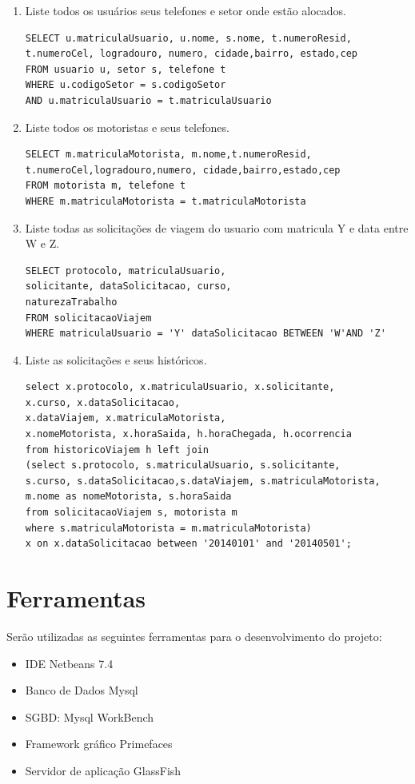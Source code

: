 \documentclass[11pt]{article}
\begin{document}
\begin{enumerate}
\item Liste todos os usuários seus telefones e setor onde estão alocados. 
\begin{verbatim}
SELECT u.matriculaUsuario, u.nome, s.nome, t.numeroResid, 
t.numeroCel, logradouro, numero, cidade,bairro, estado,cep
FROM usuario u, setor s, telefone t
WHERE u.codigoSetor = s.codigoSetor
AND u.matriculaUsuario = t.matriculaUsuario
\end{verbatim}

\item Liste todos os motoristas e seus telefones. 
\begin{verbatim}
SELECT m.matriculaMotorista, m.nome,t.numeroResid,
t.numeroCel,logradouro,numero, cidade,bairro,estado,cep
FROM motorista m, telefone t
WHERE m.matriculaMotorista = t.matriculaMotorista
\end{verbatim}

\item Liste todas as solicitações de viagem do usuario com matricula Y e data entre W e Z. 
\begin{verbatim}
SELECT protocolo, matriculaUsuario,
solicitante, dataSolicitacao, curso,
naturezaTrabalho 
FROM solicitacaoViajem 
WHERE matriculaUsuario = 'Y' dataSolicitacao BETWEEN 'W'AND 'Z'
\end{verbatim}

\item Liste as solicitações e seus históricos. 
\begin{verbatim}
select x.protocolo, x.matriculaUsuario, x.solicitante, 
x.curso, x.dataSolicitacao, 
x.dataViajem, x.matriculaMotorista, 
x.nomeMotorista, x.horaSaida, h.horaChegada, h.ocorrencia
from historicoViajem h left join 
(select s.protocolo, s.matriculaUsuario, s.solicitante, 
s.curso, s.dataSolicitacao,s.dataViajem, s.matriculaMotorista, 
m.nome as nomeMotorista, s.horaSaida 
from solicitacaoViajem s, motorista m 
where s.matriculaMotorista = m.matriculaMotorista) 
x on x.dataSolicitacao between '20140101' and '20140501';
\end{verbatim}
\end{enumerate}

\section{Ferramentas}
Serão utilizadas as seguintes ferramentas para o desenvolvimento do projeto:
\begin{itemize}
\item IDE Netbeans 7.4
\item Banco de Dados Mysql
\item SGBD: Mysql WorkBench
\item Framework gráfico Primefaces
\item Servidor de aplicação GlassFish
\end{itemize}
\end{document}

